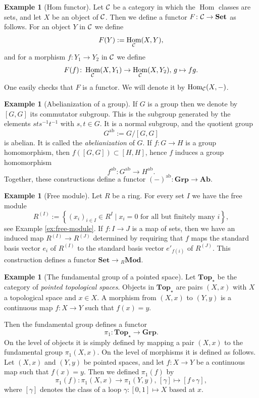 \documentclass[11pt]{amsbook}
\renewcommand{\ast}{\star}
\DeclareMathOperator\Hom{Hom}
\DeclareMathOperator\Mod{{\bf{Mod}}}
\def\ab{\mathrm{ab}}
\def\Set{\mathbf{Set}}
\def\Ab{\mathbf{Ab}}
\def\Top{\mathbf{Top}}
\def\Grp{\mathbf{Grp}}
\def\Mod{\mathbf{Mod}}
\theoremstyle{plain}
\theoremstyle{definition}
\newtheorem{example}[theorem]{Example}
\begin{document}
\begin{example}[Hom functor]\label{exa:covariant-hom-functor}
Let ${\mathcal{C}}$ be a category in which the $\Hom$ classes are sets, and let $X$ be an object of ${\mathcal{C}}$. Then we define a functor $F\colon \cC\to \Set$ as follows. For an object $Y$ in ${\mathcal{C}}$ we define
\[
	F(Y) := \Hom_\cC(X,Y),
\]
and for a morphism $f\colon Y_1 \to Y_2$ in ${\mathcal{C}}$ we define
\[
	F(f) \colon \Hom_\cC(X,Y_1) \to \Hom_\cC(X,Y_2),\, g \mapsto fg.
\]
One easily checks that $F$ is a functor. We  will denote it by $\Hom_\cC(X,-)$.
\end{example}


\begin{example}[Abelianization of a group]\label{exa:abelianization}
If $G$ is a group then we denote by $[G,G]$ its commutator subgroup. This is the subgroup generated by the elements $sts^{-1}t^{-1}$ with $s,t\in G$. It is a normal subgroup, and the quotient group
\[
	G^{\ab} := G/[G,G]
\]
is abelian. It is called the \emph{abelianization} of $G$. If $f\colon G\to H$ is a group homomorphism, then $f([G,G]) \subset [H,H]$,  hence $f$ induces a group homomorphism 
\[
	f^\ab \colon G^\ab \to H^\ab.
\]
Together, these constructions define a functor $(-)^\ab\colon \Grp\to\Ab$.
\end{example}

\begin{example}[Free module]\label{exa:free-module-functor}
Let $R$ be a ring. For every set $I$ we have the free module 
\[
	R^{(I)} := \left\{ (x_i)_{i\in I} \in R^I \mid \text{$x_i=0$ for all but finitely many $i$} \right\},
\]
see Example \ref{ex:free-module}. If $f\colon I\to J$ is a map of sets, then we have an induced map
$R^{(I)} \to R^{(J)}$ 
determined by requiring that $f$ maps the standard basis vector $e_i$ of $R^{(I)}$ to the standard basis vector $e'_{f(i)}$ of $R^{(J)}$. This construction defines a functor $\Set \to {}_R\Mod$.
\end{example}



\begin{example}[The fundamental group of a pointed space] Let $\Top_\ast$ be the category of \emph{pointed topological spaces}. Objects in $\Top_\ast$ are pairs $(X,x)$ with $X$ a topological space and $x\in X$. A morphism from $(X,x)$ to $(Y,y)$ is a continuous map $f\colon X\to Y$ such that $f(x)=y$.

Then the fundamental group defines a functor
\[
	\pi_1\colon \Top_\ast \to \Grp.
\]
On the level of objects it is simply defined by mapping a pair $(X,x)$ to the fundamental group $\pi_1(X,x)$. On the level of morphisms
it is defined as follows. Let $(X,x)$ and $(Y,y)$ be pointed spaces, and let $f \colon X\to Y$ be a continuous map such that $f(x)=y$. Then
we defined $\pi_1(f)$ by
\[
	\pi_1(f) \colon \pi_1(X,x) \to \pi_1(Y,y),\, [\gamma] \mapsto [f\circ \gamma],
\]
where $[\gamma]$ denotes the class of a loop $\gamma\colon [0,1] \mapsto X$ based at $x$.
\end{example} 
\end{document}
